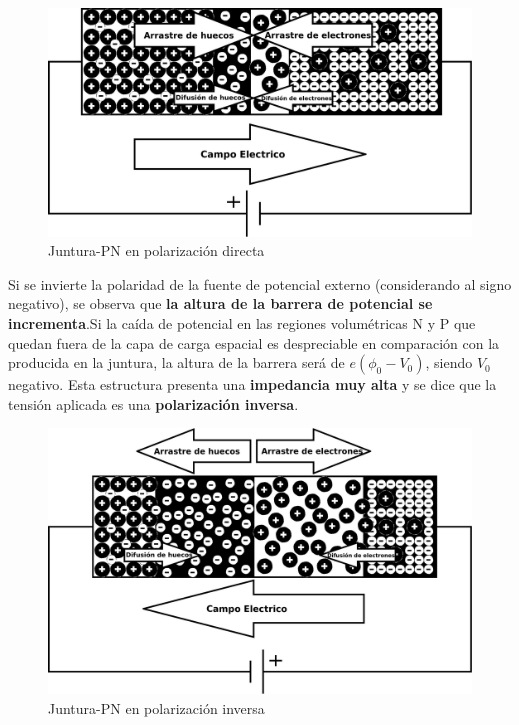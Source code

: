 \documentclass[oneside]{book}
\numberwithin{equation}{section}
\numberwithin{figure}{section}
\numberwithin{table}{section}
\begin{document}
				\begin{figure}[H]
					\begin{center}
						\includegraphics[scale=0.15]{Juntura-PN-dir.jpeg}
						\caption{Juntura-PN en polarización directa}
					\end{center}
				\end{figure}					
			
				Si se invierte la polaridad de la fuente de potencial externo (considerando al signo negativo), se observa que \textbf{la altura de la barrera de potencial se incrementa}.Si la caída de potencial en las regiones volumétricas N y P que quedan fuera de la capa de carga espacial es despreciable en comparación con la producida en la juntura, la altura de la barrera será de $e(\phi_0-V_0)$, siendo $V_0$ negativo. Esta estructura presenta una \textbf{impedancia muy alta} y se dice que la tensión aplicada es una \textbf{polarización inversa}.\\
			
				\begin{figure}[H]
					\begin{center}
						\includegraphics[scale=0.15]{Juntura-PN-inv.jpeg}
						\caption{Juntura-PN en polarización inversa}
					\end{center}
				\end{figure}					
			
\end{document}
